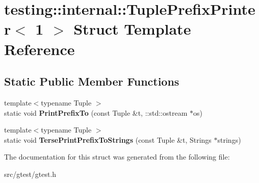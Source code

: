 \hypertarget{structtesting_1_1internal_1_1_tuple_prefix_printer_3_011_01_4}{}\section{testing\+:\+:internal\+:\+:Tuple\+Prefix\+Printer$<$ 1 $>$ Struct Template Reference}
\label{structtesting_1_1internal_1_1_tuple_prefix_printer_3_011_01_4}
\subsection*{Static Public Member Functions}
\begin{DoxyCompactItemize}
\item 
\mbox{\label{structtesting_1_1internal_1_1_tuple_prefix_printer_3_011_01_4_a4331ad652fdfb115599c8370ca4e800a}} 
{\footnotesize template$<$typename Tuple $>$ }\\static void {\bfseries Print\+Prefix\+To} (const Tuple \&t, \+::std\+::ostream $\ast$os)
\item 
\mbox{\label{structtesting_1_1internal_1_1_tuple_prefix_printer_3_011_01_4_acc513062684bbdd514a294f79a7980cc}} 
{\footnotesize template$<$typename Tuple $>$ }\\static void {\bfseries Terse\+Print\+Prefix\+To\+Strings} (const Tuple \&t, Strings $\ast$strings)
\end{DoxyCompactItemize}


The documentation for this struct was generated from the following file\+:\begin{DoxyCompactItemize}
\item 
src/gtest/gtest.\+h\end{DoxyCompactItemize}

